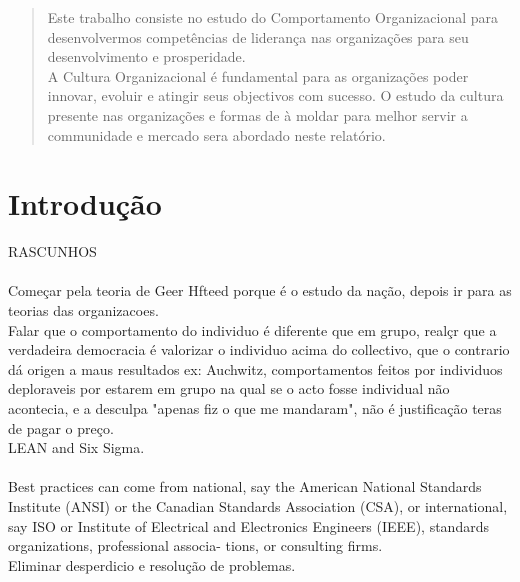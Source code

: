 
%

%
\tableofcontents
%
%
\pagestyle{plain} %
\newpage
\label{Resumo}
\begin{abstract}
Este trabalho consiste no estudo do Comportamento Organizacional para desenvolvermos competências de liderança nas organizações para seu desenvolvimento e prosperidade.\\

A Cultura Organizacional é fundamental para as organizações poder innovar, evoluir e atingir seus objectivos com sucesso. O estudo da cultura presente nas organizações e formas de à moldar para melhor servir a communidade e mercado sera abordado neste relatório.
\end{abstract}
\newpage
\section{Introdução}

RASCUNHOS \\ \\

Começar pela teoria de Geer Hfteed porque é o estudo da nação, depois ir para as teorias das organizacoes.\\

Falar que o comportamento do individuo é diferente que em grupo, realçr que a verdadeira democracia é valorizar o individuo acima do collectivo, que o contrario dá origen a maus resultados ex: Auchwitz, comportamentos feitos por individuos deploraveis por estarem em grupo na qual se o acto fosse individual não acontecia, e a desculpa "apenas fiz o que me mandaram", não é justificação teras de pagar o preço.\\


LEAN and Six Sigma.\\
\\
Best practices can come from national, say
the American National Standards Institute (ANSI) or the Canadian Standards
Association (CSA), or international, say ISO or Institute of Electrical and
Electronics Engineers (IEEE), standards organizations, professional associa-
tions, or consulting firms.\\

Eliminar desperdicio e resolução de problemas.\\

